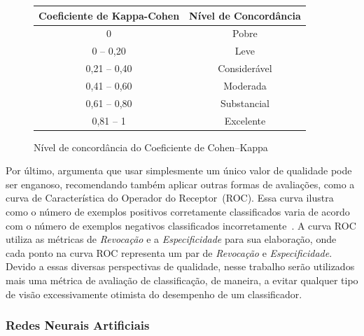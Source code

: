 \begin{figure}[!htb]
    \centering
    \begin{tabular}{c|c}
\hline \hline  
\rowcolor[HTML]{C0C0C0} 
{\color[HTML]{000000} \textbf{Coeficiente de Kappa-Cohen}} & {\color[HTML]{000000} \textbf{Nível de Concordância}} \\ \hline \hline 
{\color[HTML]{000000} 0}                                   & {\color[HTML]{000000} Pobre}                          \\ \hline
\rowcolor[HTML]{EFEFEF} 
{\color[HTML]{000000} 0 – 0,20}                            & {\color[HTML]{000000} Leve}                           \\ \hline
{\color[HTML]{000000} 0,21 – 0,40}                         & {\color[HTML]{000000} Considerável}                   \\ \hline
\rowcolor[HTML]{EFEFEF} 
{\color[HTML]{000000} 0,41 – 0,60}                         & {\color[HTML]{000000} Moderada}                       \\ \hline
{\color[HTML]{000000} 0,61 – 0,80}                         & {\color[HTML]{000000} Substancial}                    \\ \hline
\rowcolor[HTML]{EFEFEF} 
{\color[HTML]{000000} 0,81 – 1}                            & {\color[HTML]{000000} Excelente} \\ \hline \hline 
\end{tabular}
        \caption[Nível de concordância do Coeficiente de Cohen--Kappa]{Nível de concordância do Coeficiente de Cohen--Kappa}
    \label{fig:kappa}
\end{figure}

Por último,  argumenta que usar simplesmente um único valor de qualidade pode ser enganoso, recomendando também aplicar outras formas de avaliações, como a curva de Característica do Operador do Receptor~(ROC).
Essa curva ilustra como o número de exemplos positivos corretamente classificados varia de acordo com o número de exemplos negativos classificados incorretamente~\cite{Provost1998}.
A curva ROC utiliza as métricas de \textit{Revocação} e a \textit{Especificidade} para sua elaboração, onde cada ponto na curva ROC representa um par de \textit{Revocação} e \textit{Especificidade}.
Devido a essas diversas perspectivas de qualidade, nesse trabalho serão utilizados mais uma métrica de avaliação de classificação, de maneira, a evitar qualquer tipo de visão excessivamente otimista do desempenho de um classificador. 

\subsubsection{Redes Neurais Artificiais}

